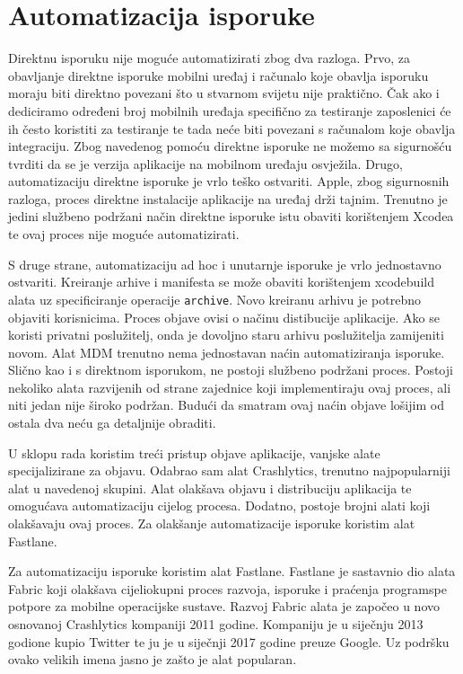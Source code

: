 \documentclass[times, utf8, diplomski, numeric]{fer}
\begin{document}
\section{Automatizacija isporuke}

Direktnu isporuku nije moguće automatizirati zbog dva razloga. Prvo, za obavljanje direktne isporuke mobilni uređaj i računalo koje obavlja isporuku moraju biti direktno povezani što u stvarnom svijetu nije praktično. Čak ako i dediciramo određeni broj mobilnih uređaja specifično za testiranje zaposlenici će ih često koristiti za testiranje te tada neće biti povezani s računalom koje obavlja integraciju. Zbog navedenog pomoću direktne isporuke ne možemo sa sigurnošću tvrditi da se je verzija aplikacije na mobilnom uređaju osvježila. Drugo, automatizaciju direktne isporuke je vrlo teško ostvariti. Apple, zbog sigurnosnih razloga, proces direktne instalacije aplikacije na uređaj drži tajnim. Trenutno je jedini službeno podržani način direktne isporuke istu obaviti korištenjem Xcodea te ovaj proces nije moguće automatizirati.

S druge strane, automatizaciju ad hoc i unutarnje isporuke je vrlo jednostavno ostvariti. Kreiranje arhive i manifesta se može obaviti korištenjem xcodebuild alata uz specificiranje operacije \verb|archive|. Novo kreiranu arhivu je potrebno objaviti korisnicima. Proces objave ovisi o načinu distibucije aplikacije. Ako se koristi privatni poslužitelj, onda je dovoljno staru arhivu poslužitelja zamijeniti novom. Alat MDM trenutno nema jednostavan naćin automatiziranja isporuke. Slično kao i s direktnom isporukom, ne postoji službeno podržani proces. Postoji nekoliko alata razvijenih od strane zajednice koji implementiraju ovaj proces, ali niti jedan nije široko podržan. Budući da smatram ovaj naćin objave lošijim od ostala dva neću ga detaljnije obraditi.

U sklopu rada koristim treći pristup objave aplikacije, vanjske alate specijalizirane za objavu. Odabrao sam alat Crashlytics, trenutno najpopularniji alat u navedenoj skupini. Alat olakšava objavu i distribuciju aplikacija te omogućava automatizaciju cijelog procesa. Dodatno, postoje brojni alati koji olakšavaju ovaj proces. Za olakšanje automatizacije isporuke koristim alat Fastlane.

Za automatizaciju isporuke koristim alat Fastlane. Fastlane je sastavnio dio alata Fabric koji olakšava cijeliokupni proces razvoja, isporuke i praćenja programspe potpore za mobilne operacijske sustave. Razvoj Fabric alata je započeo u novo osnovanoj Crashlytics kompaniji 2011 godine. Kompaniju je u siječnju 2013 godione kupio Twitter te ju je u siječnji 2017 godine preuze Google. Uz podršku ovako velikih imena jasno je zašto je alat popularan.
\end{document}
